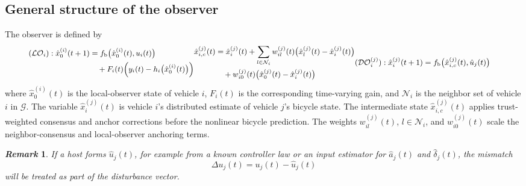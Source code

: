 \documentclass[journal,twoside]{IEEEtran}
\def\G{\mathcal{G}} %
\def\N{\mathcal{N}} %
\def\LO{\mathcal{LO}} %
\def\DO{\mathcal{DO}} %
\newtheorem{remark}{\it Remark}%
\begin{document}
\subsection{General structure of the observer}
The observer is defined by
\begin{subequations}\label{eq_observer}
\begin{small}
\begin{align}\label{eq_LO}
(\LO_i): \hat{x}_{0}^{(i)}(t+1)
&= f_{\text{b}}\big(\hat{x}_{0}^{(i)}(t),u_i(t)\big)\notag \\
&\quad + F_i(t)\Big(y_i(t)-h_i\big(\hat{x}_{0}^{(i)}(t)\big)\Big) %
\end{align}
\begin{align}\label{eq_consensus_state}
\hat{x}_{i,c}^{(j)}(t)
&= \hat{x}_i^{(j)}(t)
+\sum_{l \in \N_i} w_{il}^{(j)}(t)
   \big(\hat{x}_l^{(j)}(t)-\hat{x}_i^{(j)}(t)\big)\notag\\
&\quad + w_{i0}^{(j)}(t)
   \big(\hat{x}_0^{(j)}(t)-\hat{x}_i^{(j)}(t)\big)
\end{align}
\begin{align}\label{eq_DO}
(\DO_i^{(j)}): \hat{x}^{(j)}_i(t+1)
&= f_{\text{b}}\big(\hat{x}_{i,c}^{(j)}(t),\hat{u}_j(t)\big) %
\end{align}
\end{small}
\end{subequations}
where $\hat{x}_{0}^{(i)}(t)$ is the local-observer state of vehicle $i$, $F_i(t)$ is the corresponding time-varying gain, and $\N_i$ is the neighbor set of vehicle $i$ in $\G$. The variable $\hat{x}_i^{(j)}(t)$ is vehicle $i$'s distributed estimate of vehicle $j$'s bicycle state. The intermediate state $\hat{x}_{i,c}^{(j)}(t)$ applies trust-weighted consensus and anchor corrections before the nonlinear bicycle prediction. The weights $w_{il}^{(j)}(t)$, $l \in \N_i$, and $w_{i0}^{(j)}(t)$ scale the neighbor-consensus and local-observer anchoring terms. 

\begin{remark}\label{rem1}
If a host forms $\hat{u}_j(t)$, for example from a known controller law or an input estimator for $\hat a_j(t)$ and $\hat\delta_j(t)$, the mismatch
\begin{equation}
    \Delta u_j(t) = u_j(t) - \hat{u}_j(t)
\end{equation}
will be treated as part of the disturbance vector. %
\end{remark}
\end{document}
